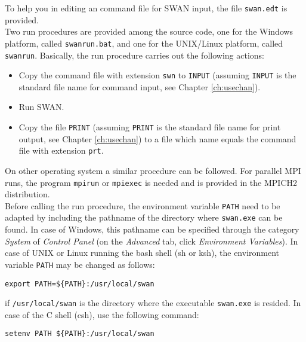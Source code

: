 \documentclass[12pt]{book}
\begin{document}
To help you in editing an command file for SWAN input, the file {\tt swan.edt} is provided.
\\[2ex]
\noindent
Two run procedures are provided among the source code, one for the Windows platform, called
{\tt swanrun.bat}, and one for the UNIX/Linux platform, called {\tt swanrun}. Basically, the
run procedure carries out the following actions:
\begin{itemize}
  \item Copy the command file with extension {\tt swn} to {\tt INPUT} (assuming {\tt INPUT} is
        the standard file name for command input, see Chapter \ref{ch:usechan}).
  \item Run SWAN.
  \item Copy the file {\tt PRINT} (assuming {\tt PRINT} is the standard file name for print
        output, see Chapter \ref{ch:usechan}) to a file which name equals the command file
        with extension {\tt prt}.
\end{itemize}
On other operating system a similar procedure can be followed. For parallel MPI runs, the
program {\tt mpirun} or {\tt mpiexec} is needed and is provided in the MPICH2 distribution.
\\[2ex]
\noindent
Before calling the run procedure, the environment variable {\small \tt PATH} need to be adapted by
including the pathname of the directory where {\tt swan.exe} can be found. In case of Windows,
this pathname can be specified through the category {\it System} of {\it Control Panel} (on the
{\it Advanced} tab, click {\it Environment Variables}).
In case of UNIX or Linux running the bash shell (sh or ksh), the environment variable
{\small \tt PATH} may be changed as follows:
\begin{verbatim}
export PATH=${PATH}:/usr/local/swan
\end{verbatim}
if {\tt /usr/local/swan} is the directory where the executable {\tt swan.exe} is resided.
In case of the C shell (csh), use the following command:
\begin{verbatim}
setenv PATH ${PATH}:/usr/local/swan
\end{verbatim}
\end{document}
